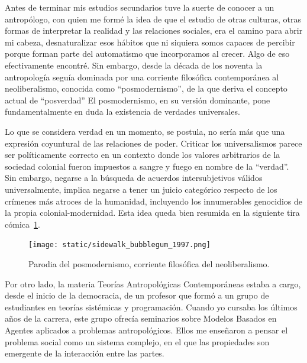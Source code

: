 \documentclass[a4paper,11pt]{book}
\theoremstyle{definition}
\begin{document}

Antes de terminar mis estudios secundarios tuve la suerte de conocer a un antrop\'ologo, con quien me form\'e la idea de que el estudio de otras culturas, otras formas de interpretar la realidad y las relaciones sociales, era el camino para abrir mi cabeza, desnaturalizar esos h\'abitos que ni siquiera somos capaces de percibir porque forman parte del automatismo que incorporamos al crecer.
%
Algo de eso efectivamente encontr\'e.
%
Sin embargo, desde la d\'ecada de los noventa la antropolog\'ia segu\'ia dominada por una corriente filos\'ofica contempor\'anea al neoliberalismo, conocida como ``posmodernismo'', de la que deriva el concepto actual de ``posverdad''
%
El posmodernismo, en su versi\'on dominante, pone fundamentalmente en duda la existencia de verdades universales.


Lo que se considera verdad en un momento, se postula, no ser\'ia m\'as que una expresi\'on coyuntural de las relaciones de poder.
%
Criticar los universalismos parece ser pol\'iticamente correcto en un contexto donde los valores arbitrarios de la sociedad colonial fueron impuestos a sangre y fuego en nombre de la ``verdad''.
%
Sin embargo, negarse a la b\'usqueda de acuerdos intersubjetivos v\'alidos universalmente, implica negarse a tener un juicio categ\'orico respecto de los cr\'imenes m\'as atroces de la humanidad, incluyendo los innumerables genocidios de la propia colonial-modernidad.
%
Esta idea queda bien resumida en la siguiente tira c\'omica~\ref{fig:sidewalk_bubblegum_1997}.


\begin{figure}[ht!]
\centering
\texttt{[image: static/sidewalk\_bubblegum\_1997.png]}
\caption{Parodia del posmodernismo, corriente filos\'ofica del neoliberalismo.}
\label{fig:sidewalk_bubblegum_1997}
\end{figure}


Por otro lado, la materia Teor\'ias Antropol\'ogicas Contempor\'aneas estaba a cargo, desde el inicio de la democracia, de un profesor que form\'o a un grupo de estudiantes en teor\'ias sist\'emicas y programaci\'on.
%
Cuando yo cursaba los \'ultimos a\~nos de la carrera, este grupo ofrec\'ia seminarios sobre Modelos Basados en Agentes aplicados a problemas antropol\'ogicos.
%
Ellos me ense\~naron a pensar el problema social como un sistema complejo, en el que las propiedades son emergente de la interacci\'on entre las partes.
\end{document}
